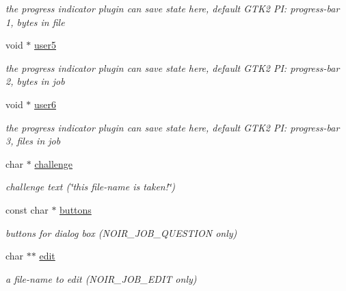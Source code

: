 \begin{CompactItemize}
\begin{CompactList}\small\item\em the progress indicator plugin can save state here, default GTK2 PI: progress-bar 1, bytes in file \item\end{CompactList}\item 
\hypertarget{struct__noir__job_o30}{
void $\ast$ \hyperlink{struct__noir__job_o30}{user5}}
\label{struct__noir__job_o30}

\begin{CompactList}\small\item\em the progress indicator plugin can save state here, default GTK2 PI: progress-bar 2, bytes in job \item\end{CompactList}\item 
\hypertarget{struct__noir__job_o31}{
void $\ast$ \hyperlink{struct__noir__job_o31}{user6}}
\label{struct__noir__job_o31}

\begin{CompactList}\small\item\em the progress indicator plugin can save state here, default GTK2 PI: progress-bar 3, files in job \item\end{CompactList}\item 
\hypertarget{struct__noir__job_o32}{
char $\ast$ \hyperlink{struct__noir__job_o32}{challenge}}
\label{struct__noir__job_o32}

\begin{CompactList}\small\item\em challenge text (\char`\"{}this file-name is taken!\char`\"{}) \item\end{CompactList}\item 
\hypertarget{struct__noir__job_o33}{
const char $\ast$ \hyperlink{struct__noir__job_o33}{buttons}}
\label{struct__noir__job_o33}

\begin{CompactList}\small\item\em buttons for dialog box (NOIR\_\-JOB\_\-QUESTION only) \item\end{CompactList}\item 
\hypertarget{struct__noir__job_o34}{
char $\ast$$\ast$ \hyperlink{struct__noir__job_o34}{edit}}
\label{struct__noir__job_o34}

\begin{CompactList}\small\item\em a file-name to edit (NOIR\_\-JOB\_\-EDIT only) \item\end{CompactList}\end{CompactItemize}



